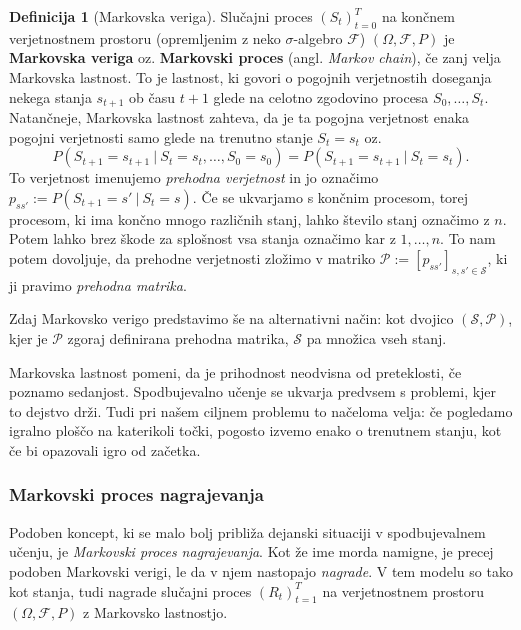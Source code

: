 \documentclass[12pt,a4paper]{amsart}
\theoremstyle{definition} %
\newtheorem{definicija}{Definicija}[section]
\theoremstyle{plain} %
\begin{document}
\begin{definicija}[Markovska veriga]\label{MarkovChain}
    Slučajni proces $(S_t)_{t=0}^T$ na končnem verjetnostnem prostoru (opremljenim z neko $\sigma$-algebro
    $\mathcal{F}$) $(\Omega, \mathcal{F}, P)$ je \textbf{Markovska veriga} oz. \textbf{Markovski proces} 
    (angl. \textit{Markov chain}), če zanj velja Markovska lastnost. To je lastnost, ki govori o 
    pogojnih verjetnostih doseganja nekega stanja $s_{t+1}$ ob času $t + 1$ glede na celotno zgodovino
    procesa $S_0, \dots, S_{t}$. Natančneje, Markovska lastnost zahteva, da je ta pogojna verjetnost 
    enaka pogojni verjetnosti samo glede na trenutno stanje $S_{t} = s_{t}$ oz.
    $$
    P(S_{t+1} = s_{t+1}~|~S_{t} = s_{t}, \dots, S_0 = s_0) = P(S_{t+1} = s_{t+1}~|~S_{t} = s_{t}).
    $$
    To verjetnost imenujemo \textit{prehodna verjetnost} in jo označimo $p_{ss'} := P(S_{t+1} = 
    s'~|~S_{t} = s)$. Če se ukvarjamo s končnim procesom, torej procesom, ki ima končno mnogo 
    različnih stanj, lahko število stanj označimo z $n$. Potem lahko brez škode za splošnost 
    vsa stanja označimo kar z $1, \dots, n$. To nam potem dovoljuje, da prehodne verjetnosti zložimo v 
    matriko $\mathcal{P} := [p_{ss'}]_{s,s'\in \mathcal{S} }$, ki ji pravimo \textit{prehodna matrika}.

    Zdaj Markovsko verigo predstavimo še na alternativni način: kot dvojico $(\mathcal{S}, 
    \mathcal{P})$, kjer je $\mathcal{P}$ zgoraj definirana prehodna matrika, $\mathcal{S}$ pa 
    množica vseh stanj.
\end{definicija}

Markovska lastnost pomeni, da je prihodnost neodvisna od preteklosti, če poznamo sedanjost. 
Spodbujevalno učenje se ukvarja predvsem s problemi, kjer to dejstvo drži. Tudi pri našem 
ciljnem problemu to načeloma velja: če pogledamo igralno ploščo na katerikoli točki, pogosto 
izvemo enako o trenutnem stanju, kot če bi opazovali igro od začetka.

\subsubsection{Markovski proces nagrajevanja}
Podoben koncept, ki se malo bolj približa dejanski situaciji v spodbujevalnem učenju, je
\textit{Markovski proces nagrajevanja}. Kot že ime morda namigne, je precej podoben Markovski 
verigi, le da v njem nastopajo \textit{nagrade}. V tem modelu so tako kot stanja, tudi nagrade 
slučajni proces $(R_t)_{t=1}^T$ na verjetnostnem prostoru $(\Omega, \mathcal{F}, P)$ z Markovsko 
lastnostjo.
\end{document}
